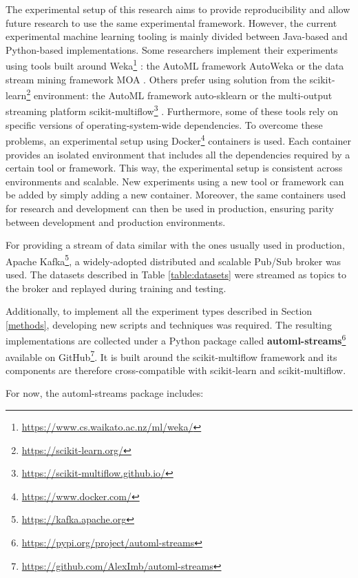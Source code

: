 \documentclass{sig-alternate-br}
\begin{document}
The experimental setup of this research aims to provide reproducibility and allow future research to use the same experimental framework. However, the current experimental machine learning tooling is mainly divided between Java-based and Python-based implementations. Some researchers implement their experiments using tools built around Weka\footnote{\url{https://www.cs.waikato.ac.nz/ml/weka/}} \cite{holmes1994weka}: the AutoML framework AutoWeka \cite{thornton2013autoweka} or the data stream mining framework MOA \cite{bifet2010moa}. Others prefer using solution from the scikit-learn\footnote{\url{https://scikit-learn.org/}} environment: the AutoML framework auto-sklearn \cite{feurer2015autosklearn} or the multi-output streaming platform scikit-multiflow\footnote{\url{https://scikit-multiflow.github.io/}} \cite{montiel2018scikit}. Furthermore, some of these tools rely on specific versions of operating-system-wide dependencies. To overcome these problems, an experimental setup using Docker\footnote{\url{https://www.docker.com/}} containers is used. Each container provides an isolated environment that includes all the dependencies required by a certain tool or framework. This way, the experimental setup is consistent across environments and scalable. New experiments using a new tool or framework can be added by simply adding a new container. Moreover, the same containers used for research and development can then be used in production, ensuring parity between development and production environments.

For providing a stream of data similar with the ones usually used in production, Apache Kafka\footnote{\url{https://kafka.apache.org}}, a widely-adopted distributed and scalable \cite{kreps2011kafka} Pub/Sub broker was used. The datasets described in Table \ref{table:datasets} were streamed as topics to the broker and replayed during training and testing. 

Additionally, to implement all the experiment types described in Section \ref{methods}, developing new scripts and techniques was required. The resulting implementations are collected under a Python package called \textbf{automl-streams}\footnote{\url{https://pypi.org/project/automl-streams}} available on GitHub\footnote{\url{https://github.com/AlexImb/automl-streams}}. It is built around the scikit-multiflow framework and its components are therefore cross-compatible with scikit-learn and scikit-multiflow. 

\vspace{1cm}
For now, the automl-streams package includes:
\end{document}
